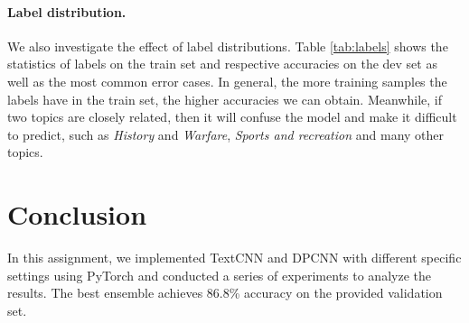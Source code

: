 \documentclass[11pt,letterpaper]{article}
\begin{document}
    \paragraph{Label distribution.} We also investigate the effect of label 
    distributions. Table \ref{tab:labels} shows the statistics of labels on 
    the train set and respective accuracies on the dev set as well as the most
    common error cases. In general, the more training samples the labels have in 
    the train set, the higher accuracies we can obtain. Meanwhile, if two topics
    are closely related, then it will confuse the model and make it difficult to
    predict, such as {\it History} and {\it Warfare}, {\it Sports and recreation}
    and many other topics.
    
\section{Conclusion}
    In this assignment, we implemented TextCNN and DPCNN with different specific
    settings using PyTorch and conducted a series of experiments to analyze the 
    results. The best ensemble achieves 86.8\% accuracy on the provided 
    validation set.
 
\vspace{1em} 
%
%


 
\appendix
\end{document}
